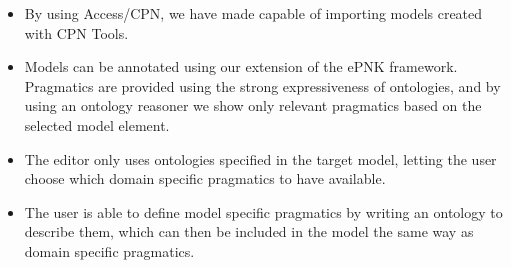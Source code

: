 \begin{itemize} 
	\item By using Access/CPN, we have made \thename{} capable of importing
	models created with CPN Tools.
	\item Models can be annotated using our extension of the ePNK framework.
	Pragmatics are provided using the strong expressiveness of ontologies, and by
	using an ontology reasoner we show only relevant pragmatics based on the
	selected model element.
	\item The editor only uses ontologies specified in the target model, letting
	the user choose which domain specific pragmatics to have available.
	\item The user is able to define model specific pragmatics by writing an
	ontology to describe them, which can then be included in the model the same way
	as domain specific pragmatics.
\end{itemize}
